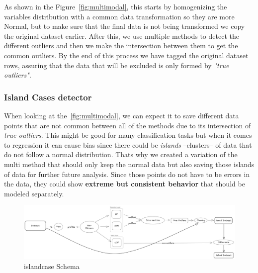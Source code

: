\documentclass[11pt,english,a4paper,hidelinks]{book}
\begin{document}
\vspace{0.5cm}
\noindent As shown in the Figure~\ref{fig:multimodal}, this starts by homogenizing the variables distribution with a common data transformation so they are more Normal, but to make sure that the final data is not being transformed we copy the original dataset earlier. After this, we use multiple methods to detect the different outliers and then we make the intersection between them to get the common outliers. By the end of this process we have tagged the original dataset rows, assuring that the data that will be excluded is only formed by \textit{"true outliers"}.


\subsubsection{Island Cases detector}


When looking at the~\ref{fig:multimodal}, we can expect it to save different data points that are not common between all of the methods due to its intersection of \textit{true outliers}. This might be good for many classification tasks but when it comes to regression it can cause bias since there could be \textit{islands} --clusters-- of data that do not follow a normal distribution. Thats why we created a variation of the \acrshort{multi} method that should only keep the normal data but also saving those islands of data for further future analysis. Since those points do not have to be errors in the data,  they could show \textbf{extreme but consistent behavior} that should be modeled separately.

\begin{figure}[H]
    \centering
    \includegraphics[width=1\textwidth]{images/code/outliers/Islands.png}
    \caption{\acrshort{islandcase} Schema}
    \label{fig:islands_of_outliers}
\end{figure}
\end{document}
